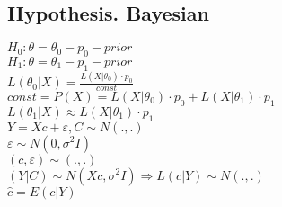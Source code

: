 \documentclass{article}
\newcommand\0{\mathbb{0}}
\newcommand\1{\mathbb{1}}
\newcommand{\Rto}{\Rightarrow}
\begin{document}
\subsection{Hypothesis. Bayesian}
$H_0: \theta = \theta_0 - p_0 - prior$\\
$H_1: \theta = \theta_1 - p_1 - prior$\\
$L(\theta_0 | X) = \frac{L(X | \theta_0) \cdot p_0}{const}$\\
$const = P(X) = L(X | \theta_0) \cdot p_0 + L(X | \theta_1) \cdot p_1$\\
$L(\theta_1 | X) \approx L(X | \theta_1) \cdot p_1$\\
$Y = Xc + \varepsilon, C \sim N(.,.)$\\
$\varepsilon \sim N(0, \sigma^2I)$\\
$(c, \varepsilon) \sim (.,.)$\\
$(Y | C) \sim N(Xc, \sigma^2I) \Rto L(c | Y) \sim N(.,.)$\\
$\widehat{c} = E(c | Y)$
\end{document}
